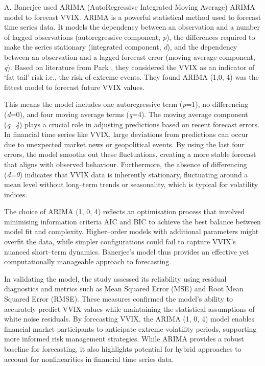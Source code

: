 \documentclass[12pt,a4paper]{report}
\numberwithin{equation}{section}
\begin{document}
A. Banerjee \cite{banerjee2020forecasting_49} used ARIMA (AutoRegressive Integrated Moving
Average) ARIMA model to forecast VVIX. ARIMA is a powerful statistical
method used to forecast time series data. It models the dependency
between an observation and a number of lagged observations
(autoregressive component, \emph{p}), the differences required to make
the series stationary (integrated component, \emph{d}), and the
dependency between an observation and a lagged forecast error (moving
average component, \emph{q}). Based on literature from Park \cite{park2015volatilityofvolatility_50},
they considered the VVIX as an indicator of `fat tail' risk i.e., the
risk of extreme events. They found ARIMA (1,0, 4) was the fittest model
to forecast future VVIX values.

This means the model includes one autoregressive term (\emph{p}=1), no
differencing (\emph{d}=0), and four moving average terms (\emph{q}=4).
The moving average component (\emph{q=4}) plays a crucial role in
adjusting predictions based on recent forecast errors. In financial time
series like VVIX, large deviations from predictions can occur due to
unexpected market news or geopolitical events. By using the last four
errors, the model smooths out these fluctuations, creating a more stable
forecast that aligns with observed behaviour. Furthermore, the absence
of differencing (\emph{d=0}) indicates that VVIX data is inherently
stationary, fluctuating around a mean level without long--term trends or
seasonality, which is typical for volatility indices.

The choice of ARIMA (1, 0, 4) reflects an optimisation process that
involved minimising information criteria AIC and BIC to achieve the best
balance between model fit and complexity. Higher--order models with
additional parameters might overfit the data, while simpler
configurations could fail to capture VVIX's nuanced short--term dynamics.
Banerjee's model thus provides an effective yet computationally
manageable approach to forecasting.

In validating the model, the study assessed its reliability using
residual diagnostics and metrics such as Mean Squared Error (MSE) and
Root Mean Squared Error (RMSE). These measures confirmed the model's
ability to accurately predict VVIX values while maintaining the
statistical assumptions of white noise residuals. By forecasting VVIX,
the ARIMA (1, 0, 4) model enables financial market participants to
anticipate extreme volatility periods, supporting more informed risk
management strategies. While ARIMA provides a robust baseline for
forecasting, it also highlights potential for hybrid approaches to
account for nonlinearities in financial time series data.
\end{document}
